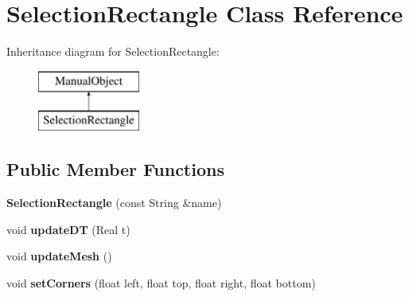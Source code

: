 \hypertarget{class_selection_rectangle}{}\section{Selection\+Rectangle Class Reference}
\label{class_selection_rectangle}
Inheritance diagram for Selection\+Rectangle\+:\begin{figure}[H]
\begin{center}
\leavevmode
\includegraphics[height=2.000000cm]{class_selection_rectangle}
\end{center}
\end{figure}
\subsection*{Public Member Functions}
\begin{DoxyCompactItemize}
\item 
\mbox{\label{class_selection_rectangle_a0f65ff3b042ba0163ab66fad82540420}} 
{\bfseries Selection\+Rectangle} (const String \&name)
\item 
\mbox{\label{class_selection_rectangle_a4b5280eb3512b829c5ef53875e88ffd5}} 
void {\bfseries update\+DT} (Real t)
\item 
\mbox{\label{class_selection_rectangle_a8f772ad503b0801af9831546d2b80199}} 
void {\bfseries update\+Mesh} ()
\item 
\mbox{\label{class_selection_rectangle_a89a4528287559860ed9f2a3e6152f275}} 
void {\bfseries set\+Corners} (float left, float top, float right, float bottom)
\end{DoxyCompactItemize}
